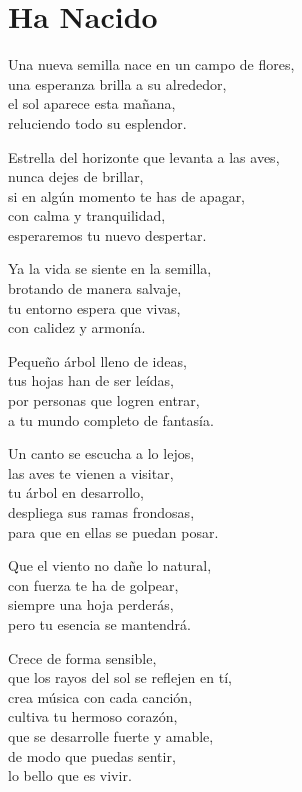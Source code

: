 \section*{Ha Nacido}
\label{Ha_nacido}

\vspace{1em}
\begin{center}
Una nueva semilla nace en un campo de flores,\\ 
una esperanza brilla a su alrededor,\\ 
el sol aparece esta mañana,\\ 
reluciendo todo su esplendor.

\vspace{1em} 
Estrella del horizonte que levanta a las aves,\\ 
nunca dejes de brillar,\\ 
si en algún momento te has de apagar,\\ 
con calma y tranquilidad,\\ 
esperaremos tu nuevo despertar.

\vspace{1em} 
Ya la vida se siente en la semilla,\\ 
brotando de manera salvaje,\\ 
tu entorno espera que vivas,\\ 
con calidez y armonía.

\vspace{1em} 
Pequeño árbol lleno de ideas,\\ 
tus hojas han de ser leídas,\\ 
por personas que logren entrar,\\ 
a tu mundo completo de fantasía.

\vspace{1em} 
Un canto se escucha a lo lejos,\\ 
las aves te vienen a visitar,\\ 
tu árbol en desarrollo,\\ 
despliega sus ramas frondosas,\\ 
para que en ellas se puedan posar.

\vspace{1em} 
Que el viento no dañe lo natural,\\ 
con fuerza te ha de golpear,\\ 
siempre una hoja perderás,\\ 
pero tu esencia se mantendrá.

\vspace{1em} 
Crece de forma sensible,\\ 
que los rayos del sol se reflejen en tí,\\ 
crea música con cada canción,\\ 
cultiva tu hermoso corazón,\\ 
que se desarrolle fuerte y amable,\\ 
de modo que puedas sentir,\\ 
lo bello que es vivir.


\end{center}




